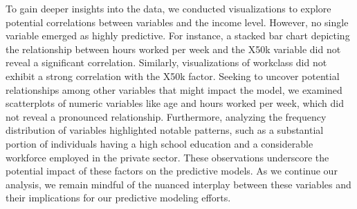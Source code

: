 \documentclass{article}
\begin{document}
To gain deeper insights into the data, we conducted visualizations to explore potential correlations between variables and the income level. However, no single variable emerged as highly predictive. For instance, a stacked bar chart depicting the relationship between hours worked per week and the X50k variable did not reveal a significant correlation. Similarly, visualizations of workclass did not exhibit a strong correlation with the X50k factor. Seeking to uncover potential relationships among other variables that might impact the model, we examined scatterplots of numeric variables like age and hours worked per week, which did not reveal a pronounced relationship. Furthermore, analyzing the frequency distribution of variables highlighted notable patterns, such as a substantial portion of individuals having a high school education and a considerable workforce employed in the private sector. These observations underscore the potential impact of these factors on the predictive models. As we continue our analysis, we remain mindful of the nuanced interplay between these variables and their implications for our predictive modeling efforts.
\end{document}
